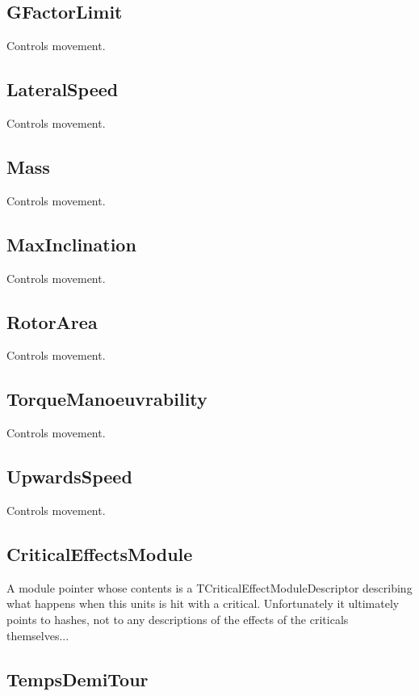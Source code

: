 \documentclass{article}
\begin{document}
\subsection{GFactorLimit}

Controls movement.

\subsection{LateralSpeed}

Controls movement.

\subsection{Mass}

Controls movement.

\subsection{MaxInclination}

Controls movement.

\subsection{RotorArea}

Controls movement.

\subsection{TorqueManoeuvrability}

Controls movement.

\subsection{UpwardsSpeed}

Controls movement.

\subsection{CriticalEffectsModule}

A module pointer whose contents is a TCriticalEffectModuleDescriptor describing what happens when this units is hit with a critical. Unfortunately it ultimately points to hashes, not to any descriptions of the effects of the criticals themselves...

\subsection{TempsDemiTour}
\end{document}
